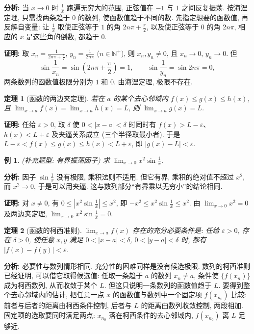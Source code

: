 \documentclass[UTF8,openany]{ctexbook}
\theoremstyle{chinesetextbook}
\newtheorem{example}{例}[section]
\newtheorem{theorem}{定理}[section]
\newenvironment{cnproof}{\par\indent\textbf{证明:} \ignorespaces}{\par}
\begin{document}
\par\indent\textbf{分析:} 当 $x\to0$ 时 $\displaystyle\frac1x$ 跑遍无穷大的范围, 正弦值在 $-1$ 与 $1$ 之间反复振荡. 按海涅定理, 只需找两条趋于 $0$ 的数列, 使函数值趋于不同的数. 先指定想要的函数值, 再反解自变量: 让 $\displaystyle\frac1x$ 取使正弦等于 $1$ 的角 $\displaystyle2n\pi+\frac\pi2$, 以及使正弦等于 $0$ 的角 $2n\pi$, 相应的 $x$ 是这些角的倒数, 都趋于 $0$.
\begin{cnproof}
取 $\displaystyle x_n=\frac1{2n\pi+\frac\pi2}$, $\displaystyle y_n=\frac1{2n\pi}$ ($n\in\mathbb N^+$), 则 $x_n,y_n\ne0$, 且 $x_n\to0$, $y_n\to0$. 但
\[
\sin\frac1{x_n}=\sin\left(2n\pi+\frac\pi2\right)=1,\qquad
\sin\frac1{y_n}=\sin2n\pi=0,
\]
两条数列的函数值极限分别为 $1$ 和 $0$. 由海涅定理, 极限不存在.
\end{cnproof}
\begin{theorem}[函数的两边夹定理]
若在 $a$ 的某个去心邻域内 $f(x)\le g(x)\le h(x)$, 且 $\displaystyle\lim_{x\to a}f(x)=\lim_{x\to a}h(x)=L$, 则 $\displaystyle\lim_{x\to a}g(x)=L$.
\end{theorem}
\begin{cnproof}
任给 $\varepsilon>0$, 取 $\delta$ 使 $0<|x-a|<\delta$ 时同时有 $f(x)>L-\varepsilon$、$h(x)<L+\varepsilon$ 及夹逼关系成立 (三个半径取最小者). 于是 $L-\varepsilon<f(x)\le g(x)\le h(x)<L+\varepsilon$, 即 $|g(x)-L|<\varepsilon$.
\end{cnproof}
\begin{example}
\textnormal{(补充题型: 有界振荡因子)} 求 $\displaystyle\lim_{x\to0}x^2\sin\frac1x$.
\end{example}
\par\indent\textbf{分析:} 因子 $\displaystyle\sin\frac1x$ 没有极限, 乘积法则不适用. 但它有界, 乘积的绝对值不超过 $x^2$, 而 $x^2\to0$, 于是可以用夹逼. 这与数列部分“有界乘以无穷小”的结论相同.
\begin{cnproof}
对 $x\ne0$, 有 $\displaystyle0\le\left|x^2\sin\frac1x\right|\le x^2$, 即 $\displaystyle-x^2\le x^2\sin\frac1x\le x^2$. 由 $\displaystyle\lim_{x\to0}x^2=0$ 及两边夹定理, $\displaystyle\lim_{x\to0}x^2\sin\frac1x=0$.
\end{cnproof}
\begin{theorem}[函数的柯西准则]
$\displaystyle\lim_{x\to a}f(x)$ 存在的充分必要条件是: 任给 $\varepsilon>0$, 存在 $\delta>0$, 使任意 $x,y$ 满足 $0<|x-a|<\delta$, $0<|y-a|<\delta$ 时, 都有 $|f(x)-f(y)|<\varepsilon$.
\end{theorem}
\par\indent\textbf{分析:} 必要性与数列情形相同. 充分性的困难同样是没有候选极限. 数列的柯西准则已经证明, 可以借它取得候选值: 任取一条趋于 $a$ 的数列 $x_n\ne a$, 条件使 $\{f(x_n)\}$ 成为柯西数列, 从而收敛于某个 $L$. 但这只说明一条数列的函数值趋于 $L$. 要得到整个去心邻域内的估计, 把任意一点 $x$ 的函数值与数列中一个固定项 $f(x_{n_0})$ 比较: 前者与后者的距离由柯西条件控制, 后者与 $L$ 的距离由数列收敛控制, 两段相加. 固定项的选取要同时满足两点: $x_{n_0}$ 落在柯西条件的去心邻域内, $f(x_{n_0})$ 离 $L$ 足够近.
\end{document}
